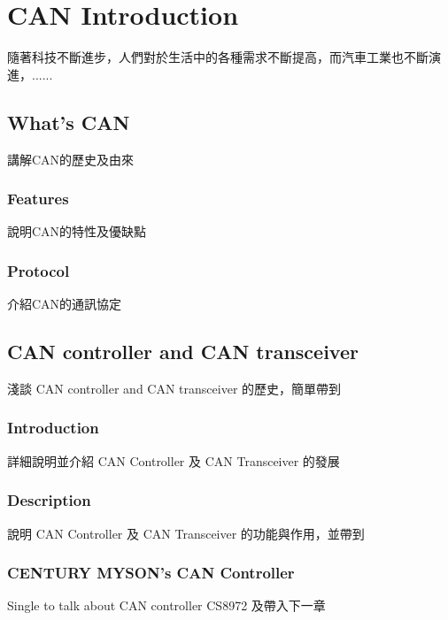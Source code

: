 \chapter{CAN Introduction}
	隨著科技不斷進步，人們對於生活中的各種需求不斷提高，而汽車工業也不斷演進，......
	\section{What's CAN}
	講解CAN的歷史及由來
		\subsection{Features}
		說明CAN的特性及優缺點
		\subsection{Protocol}
		介紹CAN的通訊協定
	\section{CAN controller and CAN transceiver}
	淺談 CAN controller and CAN transceiver 的歷史，簡單帶到
		\subsection{Introduction}
		詳細說明並介紹 CAN Controller 及 CAN Transceiver 的發展
		\subsection{Description}
		說明 CAN Controller 及 CAN Transceiver 的功能與作用，並帶到
		\subsection{CENTURY MYSON's CAN Controller}
			Single to talk about CAN controller CS8972 及帶入下一章